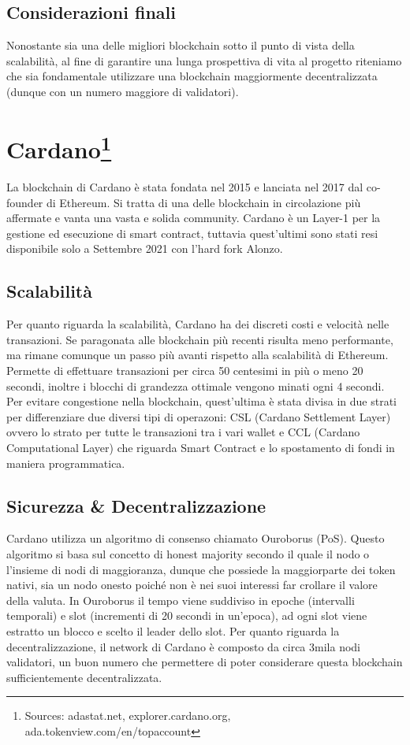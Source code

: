 \documentclass[a4paper, 12pt]{article}
\begin{document}
\subsection*{Considerazioni finali}
Nonostante sia una delle migliori blockchain sotto il punto di vista della scalabilità, al fine di garantire una lunga prospettiva di vita al progetto riteniamo che sia fondamentale utilizzare una blockchain maggiormente decentralizzata (dunque con un numero maggiore di validatori).

\newpage
\section*{Cardano\footnote{Sources: adastat.net, explorer.cardano.org, ada.tokenview.com/en/topaccount}}
La blockchain di Cardano è stata fondata nel 2015 e lanciata nel 2017 dal co-founder di Ethereum. Si tratta di una delle blockchain in circolazione più affermate e vanta una vasta e solida community. Cardano è un Layer-1 per la gestione ed esecuzione di smart contract, tuttavia quest'ultimi sono stati resi disponibile solo a Settembre 2021 con l'hard fork Alonzo.
\subsection*{Scalabilità}
Per quanto riguarda la scalabilità, Cardano ha dei discreti costi e velocità nelle transazioni. Se paragonata alle blockchain più recenti risulta meno performante, ma rimane comunque un passo più avanti rispetto alla scalabilità di Ethereum. Permette di effettuare transazioni per circa 50 centesimi in più o meno 20 secondi, inoltre i blocchi di grandezza ottimale vengono minati ogni 4 secondi. Per evitare congestione nella blockchain, quest'ultima è stata divisa in due strati per differenziare due diversi tipi di operazoni: CSL (Cardano Settlement Layer) ovvero lo strato per tutte le transazioni tra i vari wallet e CCL (Cardano Computational Layer) che riguarda Smart Contract e lo spostamento di fondi in maniera programmatica.
\subsection*{Sicurezza \& Decentralizzazione}
Cardano utilizza un algoritmo di consenso chiamato Ouroborus (PoS). Questo algoritmo si basa sul concetto di honest majority secondo il quale il nodo o l'insieme di nodi di maggioranza, dunque che possiede la maggiorparte dei token nativi, sia un nodo onesto poiché non è nei suoi interessi far crollare il valore della valuta. In Ouroborus il tempo viene suddiviso in epoche (intervalli temporali) e slot (incrementi di 20 secondi in un'epoca), ad ogni slot viene estratto un blocco e scelto il leader dello slot.
Per quanto riguarda la decentralizzazione, il network di Cardano è composto da circa 3mila nodi validatori, un buon numero che permettere di poter considerare questa blockchain sufficientemente decentralizzata.
\end{document}
